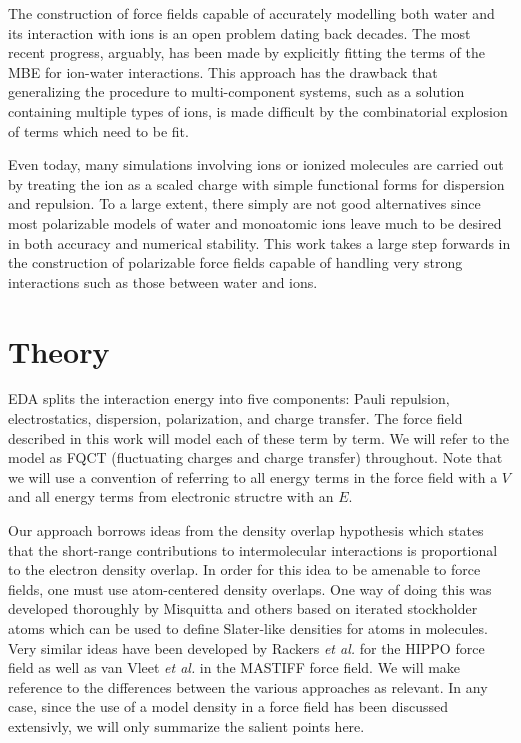 \documentclass[journal=jacsat,manuscript=article]{achemso}
\begin{document}
 The construction of force fields capable of accurately modelling both water and its interaction with ions is an open problem dating back decades. The most recent progress, arguably, has been made by explicitly fitting the terms of the MBE for ion-water interactions.\cite{zhuang2022hydration,caruso2022accurate} This approach has the drawback that generalizing the procedure to multi-component systems, such as a solution containing multiple types of ions, is made difficult by the combinatorial explosion of terms which need to be fit.

Even today, many simulations involving ions or ionized molecules are carried out by treating the ion as a scaled charge with simple functional forms for dispersion and repulsion.\cite{leontyev2011accounting,bedrov2019molecular} To a large extent, there simply are not good alternatives since most polarizable models of water and monoatomic ions leave much to be desired in both accuracy and numerical stability. This work takes a large step forwards in the construction of polarizable force fields capable of handling very strong interactions such as those between water and ions.

\section{Theory}
EDA splits the interaction energy into five components: Pauli repulsion, electrostatics, dispersion, polarization, and charge transfer. The force field described in this work will model each of these term by term. We will refer to the model as FQCT (fluctuating charges and charge transfer) throughout. Note that we will use a convention of referring to all energy terms in the force field with a $V$ and all energy terms from electronic structre with an $E$.

Our approach borrows ideas from the density overlap hypothesis\cite{kim1981dependence,wheatley1990overlap,gavezzotti2002calculation,van2016beyond,van2018new} which states that the short-range contributions to intermolecular interactions is proportional to the electron density overlap. In order for this idea to be amenable to force fields, one must use atom-centered density overlaps. One way of doing this was developed thoroughly by Misquitta and others\cite{misquitta2014distributed,misquitta2018isa} based on iterated stockholder atoms which can be used to define Slater-like densities for atoms in molecules. Very similar ideas have been developed by Rackers \textit{et al.}\cite{rackers2021polarizable} for the HIPPO force field as well as van Vleet \textit{et al.} in the MASTIFF force field.\cite{van2016beyond,van2018new}  We will make reference to the differences between the various approaches as relevant. In any case, since the use of a model density in a force field has been discussed extensivly, we will only summarize the salient points here.
\end{document}
